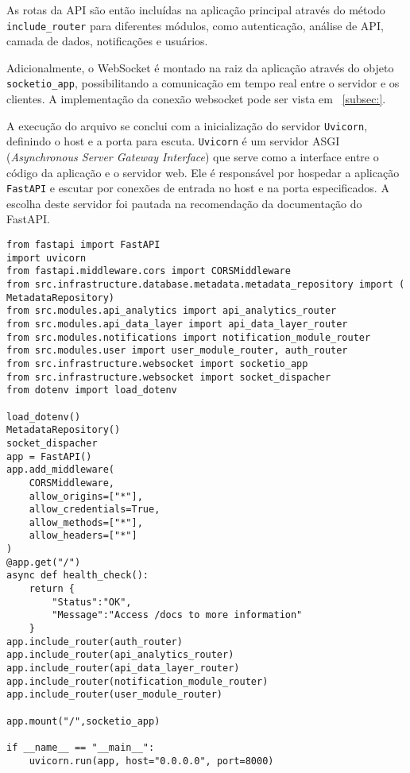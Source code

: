 As rotas da API são então incluídas na aplicação principal através do método \texttt{include\_router} para diferentes módulos, como autenticação, análise de API, camada de dados, notificações e usuários.

Adicionalmente, o WebSocket é montado na raiz da aplicação através do objeto \texttt{socketio\_app}, possibilitando a comunicação em tempo real entre o servidor e os clientes. A implementação da conexão websocket pode ser vista em ~\ref{subsec:}.%

A execução do arquivo se conclui com a inicialização do servidor \texttt{Uvicorn}, definindo o host e a porta para escuta. \texttt{Uvicorn} é um servidor ASGI (\textit{Asynchronous Server Gateway Interface}) que serve como a interface entre o código da aplicação e o servidor web. Ele é responsável por hospedar a aplicação \texttt{FastAPI} e escutar por conexões de entrada no host e na porta especificados. A escolha deste servidor foi pautada na recomendação da documentação do FastAPI.%

\begin{verbatim}
from fastapi import FastAPI
import uvicorn
from fastapi.middleware.cors import CORSMiddleware
from src.infrastructure.database.metadata.metadata_repository import (
MetadataRepository)
from src.modules.api_analytics import api_analytics_router
from src.modules.api_data_layer import api_data_layer_router
from src.modules.notifications import notification_module_router
from src.modules.user import user_module_router, auth_router
from src.infrastructure.websocket import socketio_app
from src.infrastructure.websocket import socket_dispacher
from dotenv import load_dotenv

load_dotenv()
MetadataRepository()
socket_dispacher
app = FastAPI()
app.add_middleware(
    CORSMiddleware,
    allow_origins=["*"],
    allow_credentials=True,
    allow_methods=["*"],
    allow_headers=["*"]
)
@app.get("/")
async def health_check():
    return {
        "Status":"OK",
        "Message":"Access /docs to more information"    
    }
app.include_router(auth_router)
app.include_router(api_analytics_router)
app.include_router(api_data_layer_router)
app.include_router(notification_module_router)
app.include_router(user_module_router)

app.mount("/",socketio_app)

if __name__ == "__main__":
    uvicorn.run(app, host="0.0.0.0", port=8000)
\end{verbatim}

